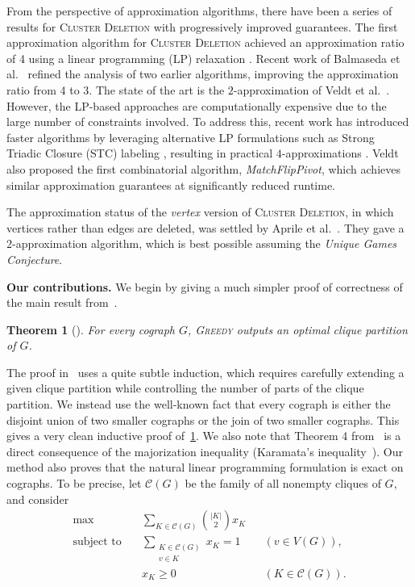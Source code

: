 \documentclass[a4paper,fleqn]{cas-sc}
\newtheorem{thm}{Theorem}[section]
\theoremstyle{remark}
\theoremstyle{plain}
\newcommand{\defn}[1]{\emph{#1}}
\newcommand{\cd}{\textsc{Cluster Deletion}}
\newcommand{\greedy}{{\textsc{Greedy}}}
\begin{document}
From the perspective of approximation algorithms, there have been a series of results for \cd{} with progressively improved guarantees. The first approximation algorithm for \cd{} achieved an approximation ratio of 4 using a linear programming (LP) relaxation \cite{CHARIKAR2005}.  Recent work of Balmaseda et al.~\cite{balmaseda2024} refined the analysis of two earlier algorithms, improving the approximation ratio from 4 to 3.  The state of the art is the $2$-approximation of Veldt et al.~\cite{veldt2018}. However, the LP-based approaches are computationally expensive due to the large number of constraints involved. To address this, recent work has introduced faster algorithms by leveraging alternative LP formulations such as Strong Triadic Closure (STC) labeling \cite{sintos2014}, resulting in practical $4$-approximations \cite{veldt2022}. Veldt~\cite{veldt2022} also proposed the first combinatorial algorithm, \defn{MatchFlipPivot}, which achieves similar approximation guarantees at significantly reduced runtime. 

The approximation status of the \emph{vertex} version of \cd{}, in
which vertices rather than edges are deleted, was settled by Aprile
et al.~\cite{ADFH23}. They gave a $2$-approximation algorithm, which
is best possible assuming the \defn{Unique Games Conjecture}.

\noindent \textbf{Our contributions.}
We begin by giving a much simpler proof of correctness of the main result from~\cite{GHN13}.
\begin{thm}[\cite{GHN13}] \label{thm:cograph}
    For every cograph $G$, \greedy{} outputs an optimal clique partition of $G$. 
\end{thm}

The proof in~\cite{GHN13} uses a quite subtle induction, which requires carefully extending a given clique partition while controlling the number of parts of the clique partition.  We instead use the well-known fact that every cograph is either the disjoint union of two smaller cographs or the join of two smaller cographs.  This gives a very clean inductive proof of~\cref{thm:cograph}. We also note that Theorem 4 from~\cite{GHN13} is a direct consequence of the majorization inequality (Karamata's inequality~\cite{MOA11}). Our method also proves that the natural linear programming formulation is exact on cographs.  To be precise, let $\mathcal{C}(G)$ be the family of all
nonempty cliques of $G$, and consider
\begin{equation*}
\begin{aligned}
\max\quad&
   \sum_{K\in\mathcal{C}(G)}\binom{|K|}{2}x_K\\
\text{subject to}\quad&
   \sum_{\substack{K\in\mathcal{C}(G)\\v\in K}}x_K=1
      &&(v\in V(G)),\\
&x_K\geq 0 &&(K\in\mathcal{C}(G)).
\end{aligned}
\tag{LP}\label{lp:clique-partition}
\end{equation*}
\end{document}
